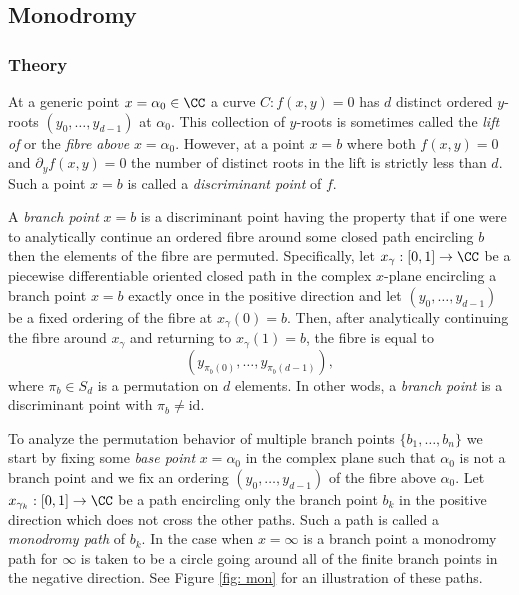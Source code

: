 \subsection{Monodromy} \label{sec: monodromy}

%
\subsubsection*{Theory}
%

At a generic point $x = \alpha_0 \in \CC$ a curve $C : f(x,y) = 0$ has
$d$ distinct ordered $y$-roots $(y_0,\ldots,y_{d-1})$ at
$\alpha_0$. This collection of $y$-roots is sometimes called the {\it
  lift of} or the {\it fibre above} $x=\alpha_0$. However, at a point
$x=b$ where both $f(x,y) = 0$ and $\partial_y f(x,y) = 0$ the number of
distinct roots in the lift is strictly less than $d$. Such a point $x =
b$ is called a {\it discriminant point} of $f$.

A {\it branch point} $x=b$ is a discriminant point having the property
that if one were to analytically continue an ordered fibre around some
closed path encircling $b$ then the elements of the fibre are
permuted. Specifically, let $x_{\gamma} : [0,1] \to \CC$ be a piecewise
differentiable oriented closed path in the complex $x$-plane encircling
a branch point $x=b$ exactly once in the positive direction and let
$(y_0,\ldots,y_{d-1})$ be a fixed ordering of the fibre at $x_\gamma(0)
= b$. Then, after analytically continuing the fibre around $x_\gamma$
and returning to $x_\gamma(1) = b$, the fibre is equal to
\[
    (y_{\pi_b(0)}, \ldots, y_{\pi_b(d-1)}),
\]
where $\pi_b \in S_d$ is a permutation on $d$ elements. In other wods, a
{\it branch point} is a discriminant point with $\pi_b \neq \text{id}$.

To analyze the permutation behavior of multiple branch points
$\{b_1,\ldots,b_n\}$ we start by fixing some {\it base point}
$x=\alpha_0$ in the complex plane such that $\alpha_0$ is not a branch
point and we fix an ordering $(y_0,\ldots,y_{d-1})$ of the fibre above
$\alpha_0$. Let $x_{\gamma_k} : [0,1] \to \CC$ be a path encircling only
the branch point $b_k$ in the positive direction which does not cross
the other paths. Such a path is called a {\it monodromy path} of
$b_k$. In the case when $x = \infty$ is a branch point a monodromy path
for $\infty$ is taken to be a circle going around all of the finite
branch points in the negative direction. See Figure \ref{fig: mon} for
an illustration of these paths.

